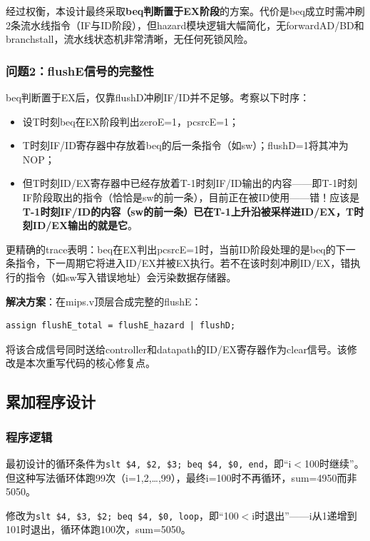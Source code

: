经过权衡，本设计最终采取\textbf{beq判断置于EX阶段}的方案。代价是beq成立时需冲刷2条流水线指令（IF与ID阶段），但hazard模块逻辑大幅简化，无forwardAD/BD和branchstall，流水线状态机非常清晰，无任何死锁风险。

\subsubsection{问题2：flushE信号的完整性}

beq判断置于EX后，仅靠flushD冲刷IF/ID并不足够。考察以下时序：

\begin{itemize}
    \item 设T时刻beq在EX阶段判出zeroE=1，pcsrcE=1；
    \item T时刻IF/ID寄存器中存放着beq的后一条指令（如sw）；flushD=1将其冲为NOP；
    \item 但T时刻ID/EX寄存器中已经存放着T-1时刻IF/ID输出的内容——即T-1时刻IF阶段取出的指令（恰恰是sw的前一条），目前正在被ID使用——错！应该是\textbf{T-1时刻IF/ID的内容（sw的前一条）已在T-1上升沿被采样进ID/EX，T时刻ID/EX输出的就是它}。
\end{itemize}

更精确的trace表明：beq在EX判出pcsrcE=1时，当前ID阶段处理的是beq的下一条指令，下一周期它将进入ID/EX并被EX执行。若不在该时刻冲刷ID/EX，错执行的指令（如sw写入错误地址）会污染数据存储器。

\textbf{解决方案}：在mips.v顶层合成完整的flushE：
\begin{verbatim}
assign flushE_total = flushE_hazard | flushD;
\end{verbatim}
将该合成信号同时送给controller和datapath的ID/EX寄存器作为clear信号。该修改是本次重写代码的核心修复点。

\subsection{累加程序设计}

\subsubsection{程序逻辑}

最初设计的循环条件为\texttt{slt \$4, \$2, \$3; beq \$4, \$0, end}，即``i$<$100时继续''。但这种写法循环体跑99次（i=1,2,\ldots,99），最终i=100时不再循环，sum=4950而非5050。

修改为\texttt{slt \$4, \$3, \$2; beq \$4, \$0, loop}，即``100$<$i时退出''——i从1递增到101时退出，循环体跑100次，sum=5050。

